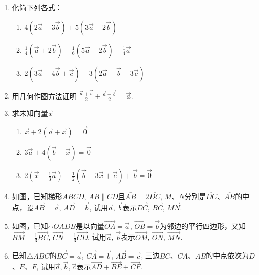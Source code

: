 \begin{ex}
\begin{enumerate}
    \item 化简下列各式：
\begin{enumerate}
    \item $4\left(2\vec{a}-3\vec{b}\right)+5\left(3\vec{a}-2\vec{b}\right)$
    \item $\frac{1}{4}\left(\vec{a}+2\vec{b}\right)-\frac{1}{6}\left(5\vec{a}-2\vec{b}\right)+\frac{1}{4}\vec{a}$
    \item $2\left(3\vec{a}-4\vec{b}+\vec{c}\right)-3\left(2\vec{a}+\vec{b}-3\vec{c}\right)$
\end{enumerate}
\item 用几何作图方法证明
$\frac{\vec{a}+\vec{b}}{2}+\frac{\vec{a}-\vec{b}}{2}=\vec{a}$.
\item 求未知向量$\vec{x}$
\begin{enumerate}
    \item $\vec{x}+2\left(\vec{a}+\vec{x}\right)=\vec{0}$
    \item $3\vec{a}+4\left(\vec{b}-\vec{x}\right)=\vec{0}$
    \item $2\left(\vec{x}-\frac{1}{3}\vec{a}\right)-\frac{1}{2}\left(\vec{b}-3\vec{x}+\vec{c}\right)+\vec{b}=\vec{0}$
\end{enumerate}
\item 如图，已知梯形$ABCD$, $AB\parallel CD$且$\overline{AB}=2\overline{DC}$, $M$、$N$分别是$\overline{DC}$、$\overline{AB}$的中点，设$\Vec{AB}=\vec{a}$, $\Vec{AD}=\vec{b}$, 试用$\vec{a}$, $\vec{b}$表示$\Vec{DC}$, $\Vec{BC}$, $\Vec{MN}$.
\item 如图，已知$\parallelogram OADB$是以向量$\Vec{OA}=\vec{a}$, $\Vec{OB}=\vec{b}$为邻边的平行四边形，又知$\Vec{BM}=\frac{1}{3}\Vec{BC}$, $\Vec{CN}=\frac{1}{3}\Vec{CD}$, 试用$\vec{a}$, $\vec{b}$表示$\Vec{OM}$, $\Vec{ON}$, $\Vec{MN}$.
\item 已知$\triangle ABC$的$\Vec{BC}=\vec{a}$, $\Vec{CA}=\vec{b}$, $\Vec{AB}=\vec{c}$, 三边$\overline{BC}$、$\overline{CA}$、$\overline{AB}$的中点依次为$D$、$E$、$F$, 试用$\vec{a},\vec{b},\vec{c}$表示$\Vec{AD}+\Vec{BE}+\Vec{CF}$.
\end{enumerate}
\end{ex}

